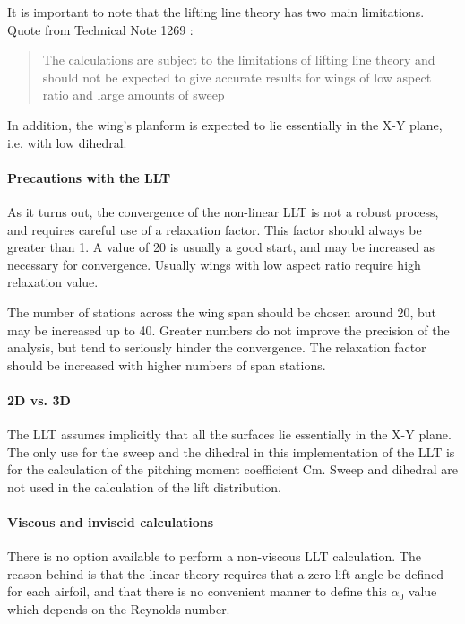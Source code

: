 \documentclass[a4paper,twoside,12pt,dvips]{article}
\begin{document}
It is important to note that the lifting line theory has two main
limitations. Quote from Technical Note 1269 \cite{Sivells47} :

\begin{quotation}
The calculations are subject to the limitations of
lifting line theory and should not be expected to give accurate results
for wings of low aspect ratio and large amounts of sweep
\end{quotation}

In addition, the wing's planform is expected to lie
essentially in the X-Y plane, i.e. with low dihedral.

\paragraph{Precautions with the LLT}

As it turns out, the convergence of the non-linear LLT is not a robust
process, and requires careful use of a relaxation factor. This factor
should always be greater than 1. A value of 20 is usually a good
start, and may be increased as necessary for convergence. \newline
Usually wings with low aspect ratio require high relaxation value.

The number of stations across the wing span should be chosen around
20, but may be increased up to 40. Greater numbers do not improve the
precision of the analysis, but tend to seriously hinder the
convergence. The relaxation factor should be increased with higher
numbers of span stations.

\paragraph{2D vs. 3D}

The LLT assumes implicitly that all the surfaces lie essentially in
the X-Y plane.\newline
The only use for the sweep and the dihedral in this implementation of
the LLT is for the calculation of the pitching moment coefficient Cm.
\newline
Sweep and dihedral are not used in the calculation of the lift
distribution.

\paragraph{Viscous and inviscid calculations}

There is no option available to perform a non-viscous LLT calculation.
The reason behind is that the linear theory requires that a zero-lift
angle be defined for each airfoil, and that there is no convenient
manner to define this $\alpha_0$ value which depends on the Reynolds
number.
\end{document}

